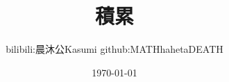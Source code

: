 \documentclass{plainbook}
\title{積累}
\author{bilibili:晨沐公Kasumi \quad github:MATHhahetaDEATH}
\date{\today}
\begin{document}
\frontmatter



\maketitle\pagebreak

% 





% 

% 

\tableofcontents

\mainmatter








% 

% 

% 

% 

% 

% 



\end{document}
